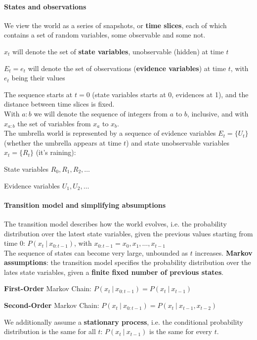 \documentclass[10pt]{report}
\begin{document}
\paragraph{States and observations} We view the world as a series of snapshots, or \textbf{time slices}, each of which contains a set of random variables, some observable and some not.
\begin{list}{}{}
	\item $x_t$ will denote the set of \textbf{state variables}, unobservable (hidden) at time $t$
	\item $E_t = e_t$ will denote the set of observations (\textbf{evidence variables}) at time $t$, with $e_t$ being their values
\end{list}
The sequence starts at $t=0$ (state variables starts at 0, evidences at 1), and the distance between time slices is fixed.\\
With $a:b$ we will denote the sequence of integers from $a$ to $b$, inclusive, and with $x_{a:b}$ the set of variables from $x_a$ to $x_b$.\\
The umbrella world is represented by a sequence of evidence variables $E_t=\{U_t\}$ (whether the umbrella appears at time $t$) and state unobservable variables $x_t=\{R_t\}$ (it's raining):
\begin{list}{}{}
	\item State variables $R_0,R_1,R_2,\ldots$
	\item Evidence variables $U_1,U_2,\ldots$
\end{list}
\paragraph{Transition model and simplifying absumptions} The transition model describes how the world evolves, i.e. the probability distribution over the latest state variables, given the previous values starting from time $0$: $P(x_t\:|\:x_{0:t-1})$, with $x_{0:t-1} = x_0,x_1,\ldots,x_{t-1}$\\
The sequence of states can become very large, unbounded as $t$ increases. \textbf{Markov assumptions}: the transition model specifies the probability distribution over the lates state variables, given a \textbf{finite fixed number of previous states}.
\begin{list}{}{}
	\item \textbf{First-Order} Markov Chain: $P(x_t\:|\:x_{0:t-1}) = P(x_t\:|\:x_{t-1})$
	\item \textbf{Second-Order} Markov Chain: $P(x_t\:|\:x_{0:t-1}) = P(x_t\:|\:x_{t-1}, x_{t-2})$
\end{list}
We additionally assume a \textbf{stationary process}, i.e. the conditional probability distribution is the same for all $t$: $P(x_t\:|\:x_{t-1})$ is the same for every $t$.
\end{document}
